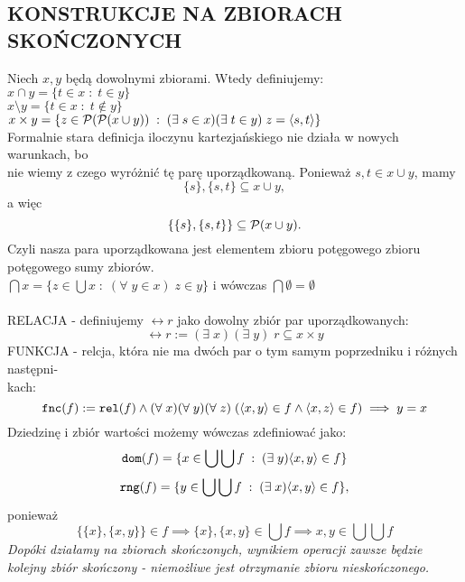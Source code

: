 \subsection{KONSTRUKCJE NA ZBIORACH SKOŃCZONYCH}
Niech $x, y$ będą dowolnymi zbiorami. Wtedy definiujemy:\medskip\\
    \indent $x\cap y=\{t\in x\;:\;t\in y\}$\smallskip\\
    \indent $x\setminus y=\{t\in x\;:\; t\notin y\}$\smallskip\\
    \indent $x\times y=\{z\in \mathcal{P}(\mathcal{P}(x\cup y))\;:\;(\exists\; s\in x)(\exists\;t\in y)\;z=\langle s, t\rangle\}$\medskip\\
Formalnie stara definicja iloczynu kartezjańskiego nie działa w nowych warunkach, bo \\nie wiemy z czego wyróżnić tę parę uporządkowaną. Ponieważ $s, t\in x\cup y$, mamy
$$\{s\}, \{s, t\}\subseteq x\cup y,$$
a więc 
$$\{\{s\}, \{s, t\}\}\subseteq \mathcal{P}(x\cup y).$$
Czyli nasza para uporządkowana jest elementem zbioru potęgowego zbioru potęgowego sumy zbiorów.\medskip\\
    \indent $\bigcap x=\{z\in \bigcup x\;:\;(\forall\;y\in x)\;z\in y\}$ i wówczas $\bigcap\emptyset=\emptyset$\bigskip\\
\bigskip\\
{\color{def}RELACJA} - definiujemy $\rel r$ jako dowolny zbiór par uporządkowanych:
$$\rel r :=(\exists\;x)(\exists\;y)\;r\subseteq x\times y$$
{\color{def}FUNKCJA} - relcja, która nie ma dwóch par o tym samym poprzedniku i różnych następni-\\kach:
$$\texttt{fnc}(f) := \texttt{rel}(f) \land (\forall\;x)(\forall\;y)(\forall\;z)\;(\langle x,y\rangle\in f\land \langle x, z\rangle \in f)\implies y = x$$
Dziedzinę i zbiór wartości możemy wówczas zdefiniować jako:
$$\texttt{dom}(f) = \{x\in \bigcup \bigcup f\;:\;(\exists\;y)\langle x,y\rangle \in f\}$$
$$\texttt{rng}(f) = \{y\in \bigcup \bigcup f\;:\;(\exists\;x)\langle x,y\rangle \in f\},$$
ponieważ 
$$\{\{x\}, \{x, y\}\}\in f\implies \{x\}, \{x, y\}\in \bigcup f\implies x,y\in\bigcup\bigcup f$$
\emph{Dopóki działamy na zbiorach skończonych, wynikiem operacji zawsze będzie kolejny zbiór skończony - niemożliwe jest otrzymanie zbioru nieskończonego.}

